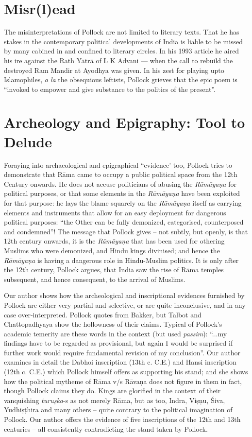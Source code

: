 \section*{Misr(l)ead}

The misinterpretations of Pollock are not limited to literary texts. That he has stakes in the contemporary political developments of India is liable to be missed by many cabined in and confined to literary circles. In his 1993 article he aired his ire against the Rath Yātrā of L K Advani --- when the call to rebuild the destroyed Ram Mandir at Ayodhya was given. In his zest for playing upto Islamophiles, {\sl a la} the obsequious leftists, Pollock grieves that the epic poem is “invoked to empower and give substance to the politics of the present”.

\section*{Archeology and Epigraphy: Tool to Delude}

Foraying into archaeological and epigraphical “evidence’ too, Pollock tries to demonstrate that Rāma came to occupy a public political space from the 12th Century onwards. He does not accuse politicians of abusing the {\sl Rāmāyaṇa} for political purposes, or that some elements in the {\sl Rāmāyaṇa} have been exploited for that purpose: he lays the blame squarely on the {\sl Rāmāyaṇa} itself as carrying elements and instruments that allow for an easy deployment for dangerous political purposes: “the Other can be fully demonized, categorised, counterposed and condemned”! The message that Pollock gives -- not subtly, but openly, is that 12th century onwards, it is the {\sl Rāmāyaṇa} that has been used for othering Muslims who were demonized, and Hindu kings divinised; and hence the {\sl Rāmāyaṇa} is having a dangerous role in Hindu-Muslim politics. It is only after the 12th century, Pollock argues, that India saw the rise of Rāma temples subsequent, and hence consequent, to the arrival of Muslims.

Our author shows how the archeological and inscriptional evidences furnished by Pollock are either very partial and selective, or are quite inconclusive, and in any case over-interpreted. Pollock quotes from Bakker, but Talbot and Chattopadhyaya show the hollowness of their claims. Typical of Pollock’s academic temerity are these words in the context (but used {\sl passim}): “...my findings have to be regarded as provisional, but again I would be surprised if further work would require fundamental revision of my conclusion”. Our author examines in detail the Dabhoi inscription (13th c. C.E.) and Hansi inscription (12th c. C.E.) which Pollock himself offers as supporting his stand; and she shows how the political mytheme of Rāma v/s Rāvaṇa does not figure in them in fact, though Pollock claims they do. Kings are glorified in the context of their vanquishing {\sl turuṣka}-s as not merely Rāma, but as too, Indra, Viṣṇu, Śiva, Yudhiṣṭhira and many others -- quite contrary to the political imagination of Pollock. Our author offers the evidence of five inscriptions of the 12th and 13th centuries -- all consistently contradicting the stand taken by Pollock.

